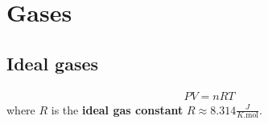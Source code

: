 \section{Gases}
\subsection{Ideal gases}

    \begin{theorem}
        \begin{gather}
            \label{thermo:ideal_gas_law}
            PV = nRT
        \end{gather}
        where $R$ is the \textbf{ideal gas constant} $R\approx8.314 \frac{J}{K.\text{mol}}$.
    \end{theorem}